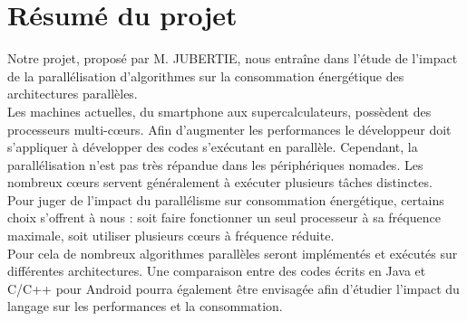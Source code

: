 \chapter{Résumé du projet}

Notre projet, proposé par M. JUBERTIE, nous entraîne dans l'étude de l'impact de la parallélisation d'algorithmes sur la consommation énergétique des architectures parallèles.\\ 

Les machines actuelles, du smartphone aux supercalculateurs, possèdent des 
processeurs multi-c\oe{}urs. Afin d'augmenter les performances le développeur doit s'appliquer à développer des codes s'exécutant en parallèle. Cependant, la parallélisation n'est pas très répandue dans les périphériques nomades. Les nombreux c\oe{}urs servent généralement à exécuter plusieurs tâches distinctes. \\

Pour juger de l'impact du parallélisme sur consommation énergétique, certains choix s'offrent à nous  : soit faire fonctionner un seul processeur à sa fréquence maximale, soit utiliser plusieurs c\oe{}urs à fréquence réduite. \\

Pour cela de nombreux algorithmes parallèles seront implémentés et exécutés sur différentes architectures.
Une comparaison entre des codes écrits en Java et C/C++ pour Android pourra 
également être envisagée afin d'étudier l'impact du langage sur les 
performances et la consommation. \\ 
